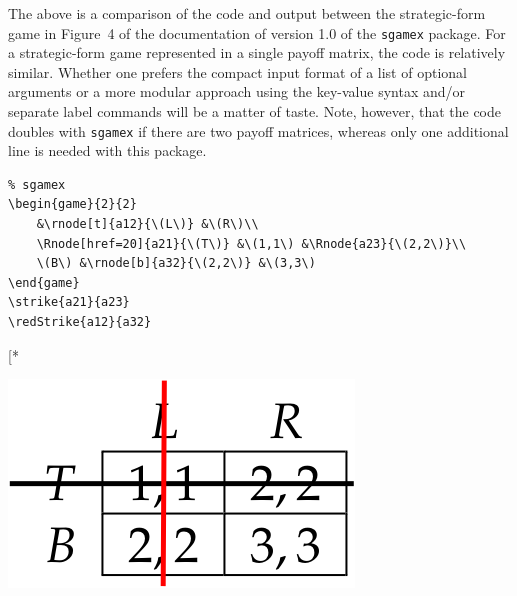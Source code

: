 \documentclass{article}
\makeatletter
\newcounter{fox}
\def\fox{\@ifstar\@fox\@@fox}
\def\@@fox{\@ifnextchar[{\fox@opt}{\fox@bgt}}
\def\largeskip{\vskip9pt plus 3pt minus 3pt}
\makeatother
\begin{document}
The above is a comparison of the code and output between the strategic-form game in Figure~4 of the documentation of version 1.0 of the \texttt{sgamex} package. For a strategic-form game represented in a single payoff matrix, the code is relatively similar. Whether one prefers the compact input format of a list of optional arguments or a more modular approach using the key-value syntax and/or separate label commands will be a matter of taste. Note, however, that the code doubles with \texttt{sgamex} if there are two payoff matrices, whereas only one additional line is needed with this package.\largeskip

\newpage

\noindent
\begin{minipage}{0.7\textwidth}
\begin{verbatim}
% sgamex
\begin{game}{2}{2}
	&\rnode[t]{a12}{\(L\)} &\(R\)\\
	\Rnode[href=20]{a21}{\(T\)} &\(1,1\) &\Rnode{a23}{\(2,2\)}\\
	\(B\) &\rnode[b]{a32}{\(2,2\)} &\(3,3\)
\end{game}
\strike{a21}{a23}
\redStrike{a12}{a32}
\end{verbatim}
\end{minipage}\hspace{0.01\textwidth}%
\begin{minipage}{0.28\textwidth}
\fox*{
\begin{center}\vspace{7.5mm}
\hspace{-1mm}\includegraphics{sgamex2}\vspace{8.8mm}
\end{center}
}
\end{minipage}
\vspace{1mm}
\end{document}
